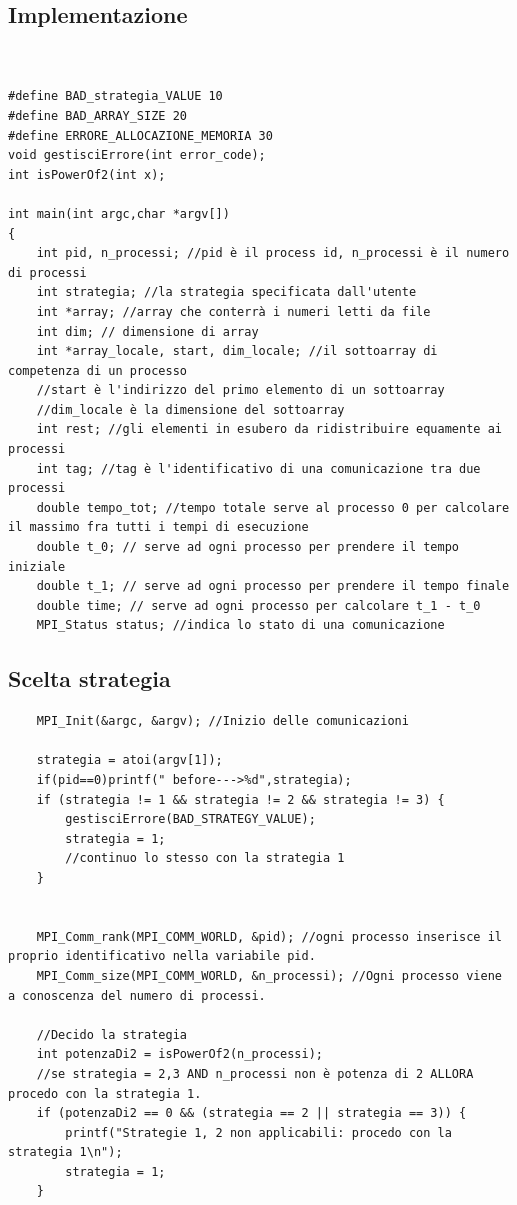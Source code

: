 \documentclass{article}
\begin{document}
\subsection{Implementazione}
\begin{lstlisting}


#define BAD_strategia_VALUE 10
#define BAD_ARRAY_SIZE 20
#define ERRORE_ALLOCAZIONE_MEMORIA 30
void gestisciErrore(int error_code);
int isPowerOf2(int x);

int main(int argc,char *argv[])
{
    int pid, n_processi; //pid è il process id, n_processi è il numero di processi
    int strategia; //la strategia specificata dall'utente
    int *array; //array che conterrà i numeri letti da file
    int dim; // dimensione di array
    int *array_locale, start, dim_locale; //il sottoarray di competenza di un processo
    //start è l'indirizzo del primo elemento di un sottoarray
    //dim_locale è la dimensione del sottoarray
    int rest; //gli elementi in esubero da ridistribuire equamente ai processi
    int tag; //tag è l'identificativo di una comunicazione tra due processi
    double tempo_tot; //tempo totale serve al processo 0 per calcolare il massimo fra tutti i tempi di esecuzione
    double t_0; // serve ad ogni processo per prendere il tempo iniziale
    double t_1; // serve ad ogni processo per prendere il tempo finale
    double time; // serve ad ogni processo per calcolare t_1 - t_0
    MPI_Status status; //indica lo stato di una comunicazione

\end{lstlisting}

\subsection{Scelta strategia}

\begin{lstlisting}
    MPI_Init(&argc, &argv); //Inizio delle comunicazioni

    strategia = atoi(argv[1]);
    if(pid==0)printf(" before--->%d",strategia);
    if (strategia != 1 && strategia != 2 && strategia != 3) {
        gestisciErrore(BAD_STRATEGY_VALUE);
        strategia = 1;
        //continuo lo stesso con la strategia 1
    }


    MPI_Comm_rank(MPI_COMM_WORLD, &pid); //ogni processo inserisce il proprio identificativo nella variabile pid. 
    MPI_Comm_size(MPI_COMM_WORLD, &n_processi); //Ogni processo viene a conoscenza del numero di processi.

    //Decido la strategia
    int potenzaDi2 = isPowerOf2(n_processi);
    //se strategia = 2,3 AND n_processi non è potenza di 2 ALLORA procedo con la strategia 1. 
    if (potenzaDi2 == 0 && (strategia == 2 || strategia == 3)) {
        printf("Strategie 1, 2 non applicabili: procedo con la strategia 1\n");
        strategia = 1;
    }
\end{lstlisting}
\end{document}
